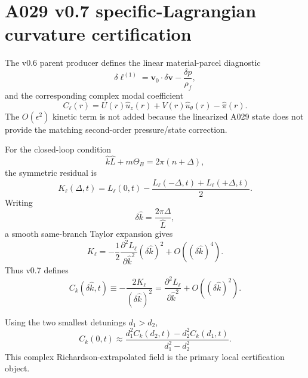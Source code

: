 \section{A029 v0.7 specific-Lagrangian curvature certification}

The v0.6 parent producer defines the linear material-parcel diagnostic
\begin{equation}
\delta \ell^{(1)}
=\mathbf v_0\!\cdot\!\delta\mathbf v-\frac{\delta p}{\rho_f},
\end{equation}
and the corresponding complex modal coefficient
\begin{equation}
C_\ell(r)=U(r)\hat u_z(r)+V(r)\hat u_\theta(r)-\hat\pi(r).
\end{equation}
The $O(\epsilon^2)$ kinetic term is not added because the linearized A029 state does not provide the matching second-order pressure/state correction.

For the closed-loop condition
\begin{equation}
\hat k\hat L+m\Theta_B=2\pi(n+\Delta),
\end{equation}
the symmetric residual is
\begin{equation}
K_\ell(\Delta,t)
=L_\ell(0,t)-\frac{L_\ell(-\Delta,t)+L_\ell(+\Delta,t)}{2}.
\end{equation}
Writing
\begin{equation}
\delta\hat k=\frac{2\pi\Delta}{\hat L},
\end{equation}
a smooth same-branch Taylor expansion gives
\begin{equation}
K_\ell
=-\frac{1}{2}\frac{\partial^2L_\ell}{\partial\hat k^2}
(\delta\hat k)^2+O((\delta\hat k)^4).
\end{equation}
Thus v0.7 defines
\begin{equation}
C_k(\delta\hat k,t)
\equiv -\frac{2K_\ell}{(\delta\hat k)^2}
=\frac{\partial^2L_\ell}{\partial\hat k^2}+O((\delta\hat k)^2).
\end{equation}

Using the two smallest detunings $d_1>d_2$,
\begin{equation}
C_k(0,t)\approx
\frac{d_1^2C_k(d_2,t)-d_2^2C_k(d_1,t)}{d_1^2-d_2^2}.
\end{equation}
This complex Richardson-extrapolated field is the primary local certification object.

